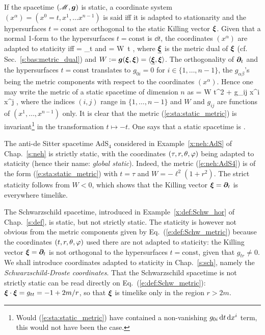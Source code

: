 If the spacetime $(\mathscr{M},\bm{g})$ is static, a coordinate system $(x^\alpha) = (x^0=t, x^1, \ldots  x^{n-1})$
is said  iff it is adapted to stationarity and the hypersurfaces
$t=\mathrm{const}$ are orthogonal to the static Killing vector $\bm{\xi}$.
Given that a normal 1-form to the hypersurfaces $t=\mathrm{const}$ is $\dd t$,
the coordinates $(x^\alpha)$ are adapted to staticity iff
\be \label{e:sta:xi_wpar_t}
    \w{\xi} = \wpar_t \qquad\mbox{and}\qquad \uu{\xi} = W\, \dd t ,
\ee
where $\underline{\bm{\xi}}$ is the metric dual of $\bm{\xi}$ (cf. Sec.~\ref{s:bas:metric_dual})
and $W := \bm{g}(\bm{\xi},\bm{\xi}) = \langle  \underline{\bm{\xi}}, \bm{\xi} \rangle$.
The orthogonality of $\bm{\partial}_t$ and the hypersurfaces $t=\mathrm{const}$
translates to $g_{0i}=0$ for $i\in\{1,\ldots,n-1\}$,
the $g_{\alpha\beta}$'s being the metric components with respect to the coordinates
$(x^\alpha)$. Hence one may write the metric of a static spacetime of dimension $n$ as
\be \label{e:sta:static_metric}
     = W \dd t^2 + g_{ij} \dd x^i \dd x^j ,
\ee
where the indices $(i,j)$ range in $\{1,\ldots,n-1\}$
and $W$ and $g_{ij}$ are functions of $(x^1,\ldots,x^{n-1})$ only.
It is clear that the metric (\ref{e:sta:static_metric}) is invariant\footnote{Would
(\ref{e:sta:static_metric}) have contained a non-vanishing $g_{0i}\, \mathrm{d} t \, \mathrm{d} x^i$ term,
this would not have been the case.} in the
transformation $t\mapsto-t$. One says that a static spacetime is
.

\begin{example}
The anti-de Sitter spacetime AdS$_{4}$ considered in Example~\ref{x:neh:AdS} of Chap.~\ref{s:neh}
is strictly static, with the coordinates $(\tau, r, \theta,\varphi)$ being
adapted to staticity (hence their name: \emph{global static}).
Indeed, the metric (\ref{e:neh:AdS4}) is of the form (\ref{e:sta:static_metric})
with $t = \tau$ and $W = -\ell^2(1+ r^2)$. The strict staticity follows from $W < 0$, which
shows that the Killing vector $\bm{\xi} = \bm{\partial}_t$ is everywhere timelike.
\end{example}

\begin{example}
The Schwarzschild spacetime, introduced in Example~\ref{x:def:Schw_hor} of Chap.~\ref{s:def}, is static, but not
strictly static. The staticity is however not obvious from the metric components
given by Eq.~(\ref{e:def:Schw_metric}) because the coordinates
$(t,r,\theta,\varphi)$ used there are not adapted to staticity: the Killing vector
$\bm{\xi} = \bm{\partial}_t$ is not orthogonal to the hypersurfaces $t=\mathrm{const}$,
given that $g_{tr} \neq 0$. We shall introduce coordinates adapted to
staticity in Chap.~\ref{s:sch}, namely the \emph{Schwarzschild-Droste coordinates}.
That the Schwarzschild spacetime is not strictly static can be read directly on
Eq.~(\ref{e:def:Schw_metric}): $\bm{\xi}\cdot\bm{\xi} = g_{tt} = -1 + 2m/r$, so
that $\bm{\xi}$ is timelike only in the region $r > 2 m$.
\end{example}

